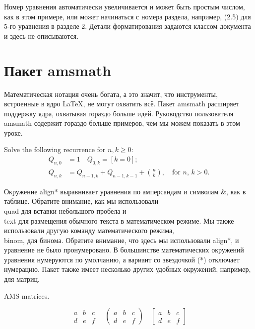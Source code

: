 \documentclass[leqno]{article}
\begin{document}
  Номер уравнения автоматически увеличивается и может быть простым числом,
  как в этом примере, или может начинаться с номера раздела, например, (2.5) для 5-го
  уравнения в разделе 2. Детали форматирования задаются классом документа
  и здесь не описываются.





  \section{Пакет amsmath}
  \label{sec:amsmath}
  
  Математическая нотация очень богата, а это значит, что инструменты, встроенные в ядро LaTeX, не могут охватить всё. 
  Пакет amsmath расширяет поддержку ядра, охватывая гораздо больше идей. 
  Руководство пользователя amsmath содержит гораздо больше примеров, чем мы можем показать в этом уроке.

  Solve the following recurrence for $ n,k\geq 0 $:
  \begin{align*}
  Q_{n,0} &= 1 \quad Q_{0,k} = [k=0]; \\
  Q_{n,k} &= Q_{n-1,k}+Q_{n-1,k-1}+\binom{n}{k},
  \quad\text{for $n$, $k>0$.}
  \end{align*}

  Окружение align* выравнивает уравнения по амперсандам и символам \&, как в таблице. 
  Обратите внимание, как мы использовали \\quad для вставки небольшого пробела и \\text для размещения обычного текста в математическом режиме. Мы также использовали другую команду математического режима, \\binom, для бинома.
  Обратите внимание, что здесь мы использовали align*, и уравнение не было пронумеровано.
  В большинстве математических окружений уравнения нумеруются по умолчанию, а вариант со звездочкой (*) отключает нумерацию.
  Пакет также имеет несколько других удобных окружений, например, для матриц.

  AMS matrices.
  \begin{center}
    \[
    \begin{matrix}
    a & b & c \\
    d & e & f
    \end{matrix}
    \quad
    \begin{pmatrix}
    a & b & c \\
    d & e & f
    \end{pmatrix}
    \quad
    \begin{bmatrix}
    a & b & c \\
    d & e & f
    \end{bmatrix}
    \]
  \end{center}
\end{document}

